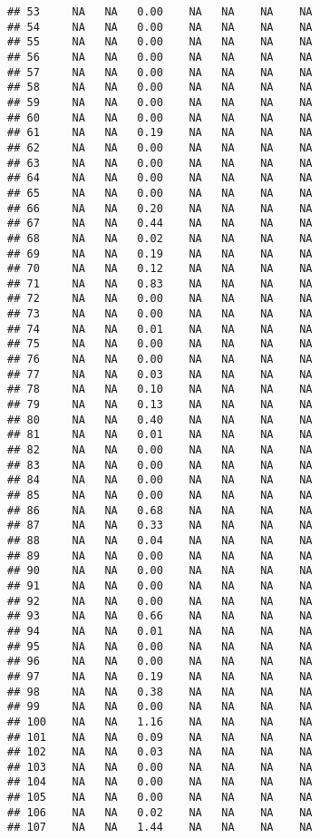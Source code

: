 \documentclass{article}\usepackage{graphicx, color}
\makeatletter
\newenvironment{kframe}{%
 \def\at@end@of@kframe{}%
 \ifinner\ifhmode%
  \def\at@end@of@kframe{\end{minipage}}%
  \begin{minipage}{\columnwidth}%
 \fi\fi%
 \def\FrameCommand##1{\hskip\@totalleftmargin \hskip-\fboxsep
 \colorbox{shadecolor}{##1}\hskip-\fboxsep
     \hskip-\linewidth \hskip-\@totalleftmargin \hskip\columnwidth}%
 \MakeFramed {\advance\hsize-\width
   \@totalleftmargin\z@ \linewidth\hsize
   \@setminipage}}%
 {\par\unskip\endMakeFramed%
 \at@end@of@kframe}
\newenvironment{knitrout}{}{} %
\makeatother
\begin{document}
\begin{knitrout}
\begin{kframe}
\begin{verbatim}
## 53     NA   NA   0.00    NA   NA    NA    NA
## 54     NA   NA   0.00    NA   NA    NA    NA
## 55     NA   NA   0.00    NA   NA    NA    NA
## 56     NA   NA   0.00    NA   NA    NA    NA
## 57     NA   NA   0.00    NA   NA    NA    NA
## 58     NA   NA   0.00    NA   NA    NA    NA
## 59     NA   NA   0.00    NA   NA    NA    NA
## 60     NA   NA   0.00    NA   NA    NA    NA
## 61     NA   NA   0.19    NA   NA    NA    NA
## 62     NA   NA   0.00    NA   NA    NA    NA
## 63     NA   NA   0.00    NA   NA    NA    NA
## 64     NA   NA   0.00    NA   NA    NA    NA
## 65     NA   NA   0.00    NA   NA    NA    NA
## 66     NA   NA   0.20    NA   NA    NA    NA
## 67     NA   NA   0.44    NA   NA    NA    NA
## 68     NA   NA   0.02    NA   NA    NA    NA
## 69     NA   NA   0.19    NA   NA    NA    NA
## 70     NA   NA   0.12    NA   NA    NA    NA
## 71     NA   NA   0.83    NA   NA    NA    NA
## 72     NA   NA   0.00    NA   NA    NA    NA
## 73     NA   NA   0.00    NA   NA    NA    NA
## 74     NA   NA   0.01    NA   NA    NA    NA
## 75     NA   NA   0.00    NA   NA    NA    NA
## 76     NA   NA   0.00    NA   NA    NA    NA
## 77     NA   NA   0.03    NA   NA    NA    NA
## 78     NA   NA   0.10    NA   NA    NA    NA
## 79     NA   NA   0.13    NA   NA    NA    NA
## 80     NA   NA   0.40    NA   NA    NA    NA
## 81     NA   NA   0.01    NA   NA    NA    NA
## 82     NA   NA   0.00    NA   NA    NA    NA
## 83     NA   NA   0.00    NA   NA    NA    NA
## 84     NA   NA   0.00    NA   NA    NA    NA
## 85     NA   NA   0.00    NA   NA    NA    NA
## 86     NA   NA   0.68    NA   NA    NA    NA
## 87     NA   NA   0.33    NA   NA    NA    NA
## 88     NA   NA   0.04    NA   NA    NA    NA
## 89     NA   NA   0.00    NA   NA    NA    NA
## 90     NA   NA   0.00    NA   NA    NA    NA
## 91     NA   NA   0.00    NA   NA    NA    NA
## 92     NA   NA   0.00    NA   NA    NA    NA
## 93     NA   NA   0.66    NA   NA    NA    NA
## 94     NA   NA   0.01    NA   NA    NA    NA
## 95     NA   NA   0.00    NA   NA    NA    NA
## 96     NA   NA   0.00    NA   NA    NA    NA
## 97     NA   NA   0.19    NA   NA    NA    NA
## 98     NA   NA   0.38    NA   NA    NA    NA
## 99     NA   NA   0.00    NA   NA    NA    NA
## 100    NA   NA   1.16    NA   NA    NA    NA
## 101    NA   NA   0.09    NA   NA    NA    NA
## 102    NA   NA   0.03    NA   NA    NA    NA
## 103    NA   NA   0.00    NA   NA    NA    NA
## 104    NA   NA   0.00    NA   NA    NA    NA
## 105    NA   NA   0.00    NA   NA    NA    NA
## 106    NA   NA   0.02    NA   NA    NA    NA
## 107    NA   NA   1.44    NA   NA    NA    NA

\end{verbatim}
\end{kframe}
\end{knitrout}
\end{document}
